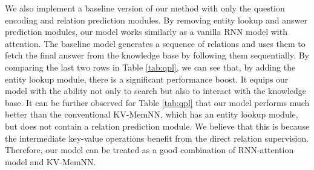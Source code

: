 

We also implement a baseline version of our method with only the question encoding and relation prediction modules. By removing entity lookup and answer prediction modules, our model works similarly as a vanilla RNN model with attention. The baseline model generates a sequence of relations and uses them to fetch the final answer from the knowledge base by following them sequentially. By comparing the last two rows in Table \ref{tab:qpl}, we can see that, by adding the entity lookup module, there is a significant performance boost. It equips our model with the ability not only to search but also to interact with the knowledge base. It can be further observed for Table \ref{tab:qpl} that our model performs much better than the conventional KV-MemNN, which has an entity lookup module, but does not contain a relation prediction module. We believe that this is because the intermediate key-value operations benefit from the direct relation supervision. Therefore, our model can be treated as a good combination of RNN-attention model and KV-MemNN. 


